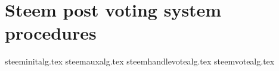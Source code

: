 \section{Steem post voting system procedures}
  \label{appendix:procs}
  {steeminitalg.tex}
  {steemauxalg.tex}
  {steemhandlevotealg.tex}
  {steemvotealg.tex}

